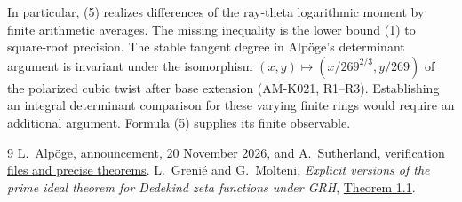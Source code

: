 \documentclass[11pt]{article}
\begin{document}
In particular, (5) realizes differences of the ray-theta logarithmic
moment by finite arithmetic averages. The missing inequality is the
lower bound (1) to square-root precision. The stable tangent degree
in Alp\"oge's determinant argument is invariant under the isomorphism
$(x,y)\mapsto(x/269^{2/3},y/269)$ of the polarized cubic twist
after base extension (AM-K021, R1--R3). Establishing an integral
determinant comparison for these varying finite rings would require
an additional argument. Formula (5) supplies its finite observable.

\begin{thebibliography}{9}
 L.~Alp\"oge, \href{https://alpo.ge/remark.pdf}{announcement},
20 November 2026, and A.~Sutherland,
\href{https://math.mit.edu/~drew/grh/}{verification files and precise theorems}.
 L.~Greni\'e and G.~Molteni, \emph{Explicit versions of the prime
ideal theorem for Dedekind zeta functions under GRH},
\href{https://arxiv.org/abs/1312.4463}{Theorem 1.1}.
\end{thebibliography}
\end{document}

